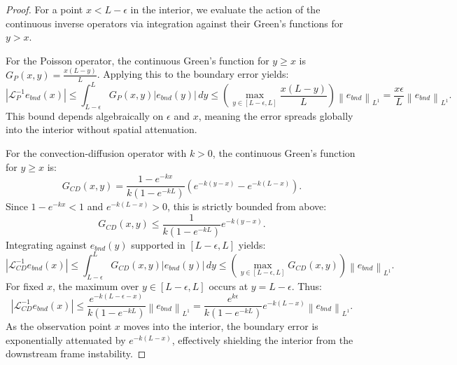 \documentclass[10pt,a4paper]{amsart}
\newcommand{\norm}[1]{\left\lVert#1\right\rVert}
\begin{document}
\begin{proof}
For a point $x < L-\epsilon$ in the interior, we evaluate the action of the continuous inverse operators via integration against their Green's functions for $y > x$.

For the Poisson operator, the continuous Green's function for $y \ge x$ is $G_P(x,y) = \frac{x(L-y)}{L}$. Applying this to the boundary error yields:
\begin{equation} |\mathcal{L}_P^{-1} e_{bnd}(x)| \le \int_{L-\epsilon}^L G_P(x,y) |e_{bnd}(y)| \,dy \le \left(\max_{y \in [L-\epsilon, L]} \frac{x(L-y)}{L}\right) \norm{e_{bnd}}_{L^1} = \frac{x\epsilon}{L} \norm{e_{bnd}}_{L^1}. \end{equation}
This bound depends algebraically on $\epsilon$ and $x$, meaning the error spreads globally into the interior without spatial attenuation.

For the convection-diffusion operator with $k > 0$, the continuous Green's function for $y \ge x$ is:
\begin{equation} G_{CD}(x,y) = \frac{1 - e^{-kx}}{k(1 - e^{-kL})} \left( e^{-k(y-x)} - e^{-k(L-x)} \right). \end{equation}
Since $1 - e^{-kx} < 1$ and $e^{-k(L-x)} > 0$, this is strictly bounded from above:
\begin{equation} G_{CD}(x,y) \le \frac{1}{k(1 - e^{-kL})} e^{-k(y-x)}. \end{equation}
Integrating against $e_{bnd}(y)$ supported in $[L-\epsilon, L]$ yields:
\begin{equation} |\mathcal{L}_{CD}^{-1} e_{bnd}(x)| \le \int_{L-\epsilon}^L G_{CD}(x,y) |e_{bnd}(y)| \,dy \le \left( \max_{y \in [L-\epsilon, L]} G_{CD}(x,y) \right) \norm{e_{bnd}}_{L^1}. \end{equation}
For fixed $x$, the maximum over $y \in [L-\epsilon, L]$ occurs at $y = L-\epsilon$. Thus:
\begin{equation} |\mathcal{L}_{CD}^{-1} e_{bnd}(x)| \le \frac{e^{-k(L-\epsilon-x)}}{k(1 - e^{-kL})} \norm{e_{bnd}}_{L^1} = \frac{e^{k\epsilon}}{k(1 - e^{-kL})} e^{-k(L-x)} \norm{e_{bnd}}_{L^1}. \end{equation}
As the observation point $x$ moves into the interior, the boundary error is exponentially attenuated by $e^{-k(L-x)}$, effectively shielding the interior from the downstream frame instability.
\end{proof}
\end{document}
